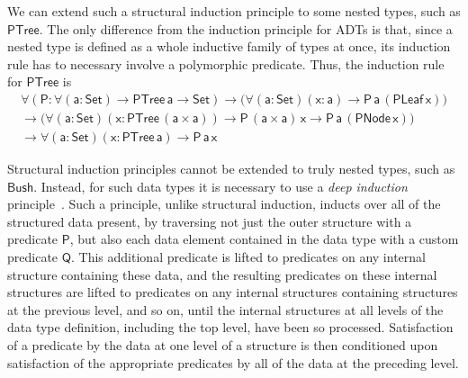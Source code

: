 \documentclass[acmsmall,screen,review,anonymous]{acmart}
\theoremstyle{definition}
\begin{document}
We can extend such a structural induction principle to some nested types, such as $\mathsf{PTree}$.
The only difference from the induction principle for ADTs is that,
since a nested type is defined as a whole inductive family of types at once,
its induction rule has to necessary involve a polymorphic predicate.
Thus, the induction rule for $\mathsf{PTree}$ is
\begin{multline}
\mathsf{\forall (P : \forall (a : Set) \to PTree\, a \to Set)
\to \big( \forall (a : Set) (x : a) \to P\,a\,(PLeaf\, x) \big)} \\
\mathsf{\to \big( \forall (a : Set) (x : PTree\,(a \times a)) \to P\,(a \times a)\,x \to P\,a\,(PNode\,x)\big)} \\
\mathsf{\to \forall (a : Set) (x : PTree\,a) \to P\,a\,x }
\end{multline}

Structural induction principles cannot be extended to truly nested types, such as $\mathsf{Bush}$.
Instead, for such data types it is necessary to use a \emph{deep induction} principle~\cite{jp20}.
Such a principle, unlike structural induction, inducts over all of the structured data present,
by traversing not just the outer structure with a predicate $\mathsf{P}$,
but also each data element contained in the data type with a custom predicate $\mathsf{Q}$.
This additional predicate is lifted to predicates on any internal structure containing these data, and the resulting predicates on these internal structures are lifted to predicates on any internal structures containing structures at the previous level, and so on, until the internal structures at all levels of the data type definition, including the top level, have been so processed.
Satisfaction of a predicate by the data at one level of a structure is then conditioned upon satisfaction of the appropriate predicates by all of the data at the preceding level.
\end{document}
